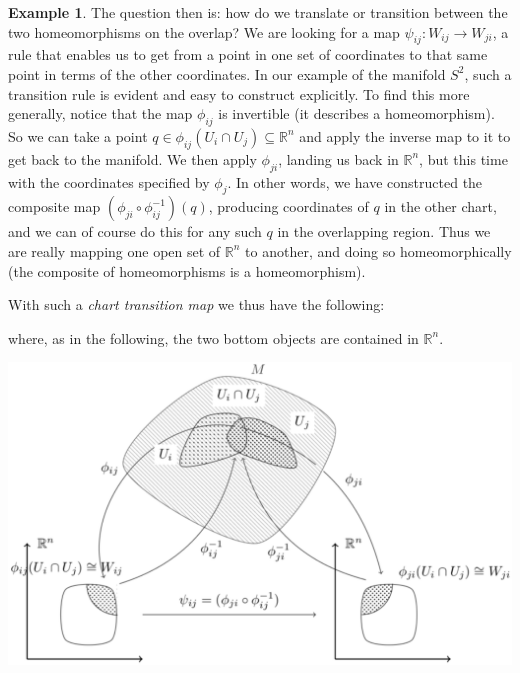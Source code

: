 \documentclass[a4paper]{book}
\theoremstyle{definition}
\newtheorem{example}{Example}[section]
\theoremstyle{definition}
\theoremstyle{definition}
\theoremstyle{theorem}
\theoremstyle{definition}
\begin{document}
\begin{example}
	The question then is: how do we translate or transition between the two homeomorphisms on the overlap? We are looking for a map $\psi_{ij}: W_{ij} \rightarrow W_{ji}$, a rule that enables us to get from a point in one set of coordinates to that same point in terms of the other coordinates. In our example of the manifold $S^2$, such a transition rule is evident and easy to construct explicitly. To find this more generally, notice that the map $\phi_{ij}$ is invertible (it describes a homeomorphism). So we can take a point $q \in \phi_{ij}(U_i \cap U_j) \subseteq \mathbb{R}^n$ and apply the inverse map to it to get back to the manifold. We then apply $\phi_{ji}$, landing us back in $\mathbb{R}^n$, but this time with the coordinates specified by $\phi_j$. In other words, we have constructed the composite map $(\phi_{ji} \circ \phi^{-1}_{ij})(q)$, producing coordinates of $q$ in the other chart, and we can of course do this for any such $q$ in the overlapping region. Thus we are really mapping one open set of $\mathbb{R}^n$ to another, and doing so homeomorphically (the composite of homeomorphisms is a homeomorphism).
	\par 
	With such a \textit{chart transition map} we thus have the following:
	\begin{center} 
	\end{center} 
	where, as in the following, the two bottom objects are contained in $\mathbb{R}^n$. 
	\begin{center} 
		\hspace*{-0.2cm}	
		\includegraphics[scale=0.32]{Manifold2BW.png}

\end{center}
\end{example}
\end{document}
